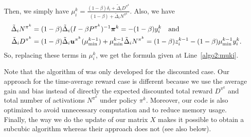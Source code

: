 \documentclass[acmsmall,screen,anonymous]{acmart}
\newcommand{\BG}[1]{\todo[color=red!10,author=\textbf{\small BG},inline]{\small #1\\}}
\begin{document}
Then, we simply have ${\mu^k_i=\displaystyle\frac{(1-\beta)\delta_i +\tilde{\Delta}_iD^{\pi^k}}{(1-\beta) +\tilde{\Delta}_iN^{\pi^k}}}$. %
Also, we have 
\begin{align*}
    \tilde{\Delta}_iN^{\pi^k}&=(1-\beta)\tilde{\Delta}_i(I-\beta P^{\pi^k})^{-1}\boldsymbol{\pi}^k=-(1-\beta)y^k_i \quad\text{and}\\
    \tilde{\Delta}_iD^{\pi^k}&={(1-\beta)\tilde{\Delta}_i\boldsymbol{u}^{\pi^k}(\mu^{k-1}_{\min}) +\mu^{k-1}_{\min}\tilde{\Delta}_i N^{\pi^k}} =(1-\beta)z^{k-1}_i -(1-\beta)\mu^{k-1}_{\min}y^k_i.
\end{align*}
So, replacing these terms in $\mu^k_i$, we get the formula given at Line~\ref{algo2:muki}.

Note that the algorithm of \cite{akbarzadeh2020conditions} was only developed for the discounted case.  Our approach for the time-average reward case is different because we use the average gain and bias instead of directly the expected discounted total reward $D^{\pi^k}$ and total number of activations $N^{\pi^k}$ under policy $\pi^k$. Moreover, our code is also optimized to avoid unnecessary computation and to reduce memory usage. Finally, the way we do the update of our matrix $X$ makes it possible to obtain a subcubic algorithm whereas their approach does not (see also below).

\end{document}
